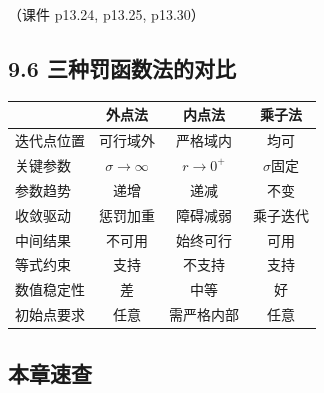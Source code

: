 （课件 p13.24, p13.25, p13.30）

\subsection{9.6 三种罚函数法的对比}

\begingroup\footnotesize\setlength{\tabcolsep}{3pt}
\begin{tabular}{@{}lccc@{}}
\toprule
& \textbf{外点法} & \textbf{内点法} & \textbf{乘子法} \\
\midrule
迭代点位置 & 可行域外 & 严格域内 & 均可 \\
关键参数 & $\sigma \to \infty$ & $r \to 0^+$ & $\sigma$固定 \\
参数趋势 & 递增 & 递减 & 不变 \\
收敛驱动 & 惩罚加重 & 障碍减弱 & 乘子迭代 \\
中间结果 & 不可用 & 始终可行 & 可用 \\
等式约束 & 支持 & 不支持 & 支持 \\
数值稳定性 & 差 & 中等 & 好 \\
初始点要求 & 任意 & 需严格内部 & 任意 \\
\bottomrule
\end{tabular}
\endgroup

\subsection{本章速查}

